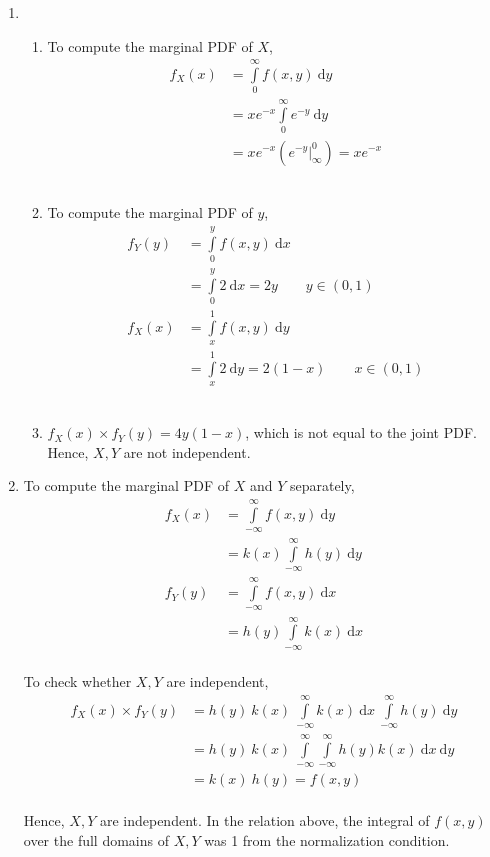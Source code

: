 \begin{enumerate}
	
	\item 
		\begin{enumerate}
			\item To compute the marginal PDF of $ X $, 
			\begin{align}
				f_X (x) &= \int\limits_{0}^{\infty} f(x, y)\ \mathrm{d}y \nonumber \\
				&= x e^{-x} \int\limits_{0}^{\infty} e^{-y}\ \mathrm{d}y \nonumber \\
				&= x e^{-x} \left(e^{-y}\Big|_\infty^0\right) = x e^{-x}
			\end{align}\\
			
			\item To compute the marginal PDF of $ y $, 
			\begin{align}
				f_Y (y) &= \int\limits_{0}^{y} f(x, y)\ \mathrm{d}x \nonumber \\
				&= \int\limits_{0}^{y} 2\ \mathrm{d}x = 2y  \qquad y \in (0, 1) \\
				f_X (x) &= \int\limits_{x}^{1} f(x, y)\ \mathrm{d}y \nonumber \\
				&= \int\limits_{x}^{1} 2\ \mathrm{d}y  = 2(1 - x)  \qquad x \in (0, 1)
			\end{align}\\
			
			\item $ f_X (x) \times f_Y (y)  = 4y(1-x)$, which is not equal to the joint PDF. Hence, $ X, Y $ are not independent. \\
		\end{enumerate}
	
	
	\item  
		To compute the marginal PDF of $ X $ and $ Y $ separately, 
		\begin{align}
			f_X (x) &= \int\limits_{-\infty}^{\infty} f(x, y)\ \mathrm{d}y \nonumber \\
			&= k(x) \int\limits_{-\infty}^{\infty} h(y)\ \mathrm{d}y \\
			f_Y (y) &= \int\limits_{-\infty}^{\infty} f(x, y)\ \mathrm{d}x \nonumber \\
			&= h(y) \int\limits_{-\infty}^{\infty} k(x)\ \mathrm{d}x
		\end{align}\\
		
		To check whether $ X, Y $ are independent, \\
		\begin{align}
			f_X (x) \times f_Y (y) &= h(y) \ k(x) \ \int\limits_{-\infty}^{\infty} k(x)\ \mathrm{d}x \ \int\limits_{-\infty}^{\infty} h(y)\ \mathrm{d}y \nonumber \\
			&= h(y) \ k(x)\ \int\limits_{-\infty}^{\infty} \int\limits_{-\infty}^{\infty} h(y) k(x) \ \mathrm{d}x \ \mathrm{d}y  \nonumber \\
			&= k(x)\ h(y) = f(x, y)
		\end{align} \\
		Hence, $ X, Y $ are independent. In the relation above, the integral of $ f(x, y) $ over the full domains of $ X, Y $ was 1 from the normalization condition. \\
	

\end{enumerate}
